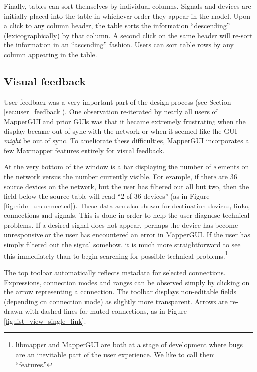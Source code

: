 Finally, tables can sort themselves by individual columns. Signals and devices are initially placed into the table in whichever order they appear in the model. Upon a click to any column header, the table sorts the information ``descending'' (lexicographically) by that column. A second click on the same header will re-sort the information in an ``ascending'' fashion. Users can sort table rows by any column appearing in the table.


	\subsection{Visual feedback} %
	\label{sub:visual_feedback}

User feedback was a very important part of the design process (see Section \ref{sec:user_feedback}). One observation re-iterated by nearly all users of MapperGUI and prior GUIs was that it became extremely frustrating when the display became out of sync with the network or when it seemed like the GUI \emph{might} be out of sync. To ameliorate these difficulties, MapperGUI incorporates a few Maxmapper features entirely for visual feedback.
		
At the very bottom of the window is a bar displaying the number of elements on the network versus the number currently visible. For example, if there are 36 source devices on the network, but the user has filtered out all but two, then the field below the source table will read ``2 of 36 devices'' (as in Figure \ref{fig:hide_unconnected}). These data are also shown for destination devices, links, connections and signals. This is done in order to help the user diagnose technical problems. If a desired signal does not appear, perhaps the device has become unresponsive or the user has encountered an error in MapperGUI. If the user has simply filtered out the signal somehow, it is much more straightforward to see this immediately than to begin searching for possible technical problems.\footnote{libmapper and MapperGUI are both at a stage of development where bugs are an inevitable part of the user experience. We like to call them ``features.''}

The top toolbar automatically reflects metadata for selected connections. Expressions, connection modes and ranges can be observed simply by clicking on the arrow representing a connection. The toolbar displays non-editable fields (depending on connection mode) as slightly more transparent. Arrows are re-drawn with dashed lines for muted connections, as in Figure \ref{fig:list_view_single_link}.

